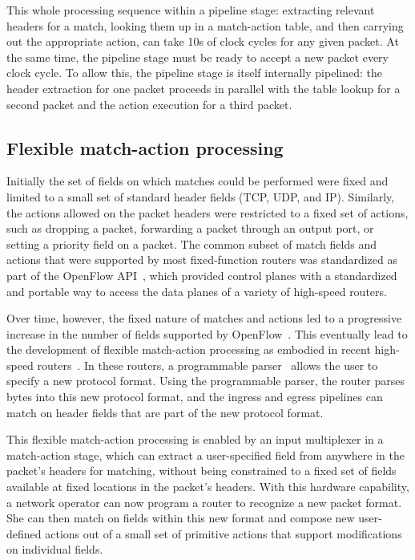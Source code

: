 This whole processing sequence within a pipeline stage: extracting relevant
headers for a match, looking them up in a match-action table, and then carrying
out the appropriate action, can take 10s of clock
cycles for any given packet. At the same time, the pipeline stage must be ready
to accept a new packet every clock cycle. To allow this, the pipeline stage is
itself internally pipelined: the header extraction for one packet proceeds
in parallel with the table lookup for a second packet and the action execution
for a third packet.

\subsection{Flexible match-action processing}
Initially the set of fields on which matches could be performed were fixed and
limited to a small set of standard header fields (\eg TCP, UDP, and IP).
Similarly, the actions allowed on the packet headers were restricted to a fixed
set of actions, such as dropping a packet, forwarding a packet through an
output port, or setting a priority field on a packet. The common subset of
match fields and actions that were supported by most fixed-function routers was
standardized as part of the OpenFlow API~\cite{openflow}, which provided
control planes with a standardized and portable way to access the data planes
of a variety of high-speed routers.

Over time, however, the fixed nature of matches and actions led to a
progressive increase in the number of fields supported by OpenFlow~\cite{p4}.
This eventually lead to the development of flexible match-action processing as
embodied in recent high-speed routers~\cite{xpliant, flexpipe, tofino}. In
these routers, a programmable parser~\cite{gibb_parsing} allows the user to
specify a new protocol format. Using the programmable parser, the router parses
bytes into this new protocol format, and the ingress and egress pipelines can
match on header fields that are part of the new protocol format.

This flexible match-action processing is
enabled by an input multiplexer in a match-action stage, which can extract a
user-specified field from anywhere in the packet's headers for matching,
without being constrained to a fixed set of fields available at fixed locations
in the packet's headers. With this hardware capability, a network operator can now
 program a router to recognize a new packet format. She can then match on fields within this new format and compose new user-defined actions out of a small set of
primitive actions that support modifications on individual fields.

